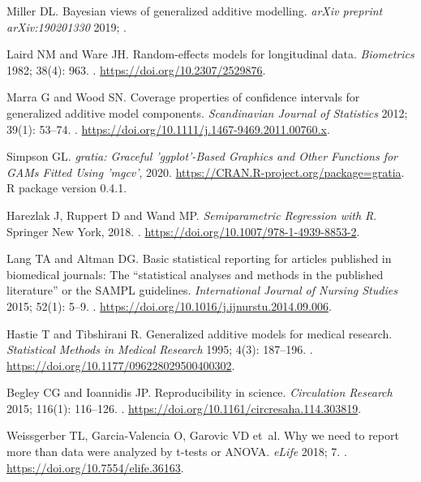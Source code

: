 \documentclass[Royal,times,doublespace,sagev]{sagej}
\begin{document}
\begin{thebibliography}{10}
Miller DL.
\newblock Bayesian views of generalized additive modelling.
\newblock \emph{arXiv preprint arXiv:190201330} 2019; .

Laird NM and Ware JH.
\newblock Random-effects models for longitudinal data.
\newblock \emph{Biometrics} 1982; 38(4): 963.
\newblock {}.
\newblock \urlprefix\url{https://doi.org/10.2307/2529876}.

Marra G and Wood SN.
\newblock Coverage properties of confidence intervals for generalized additive
  model components.
\newblock \emph{Scandinavian Journal of Statistics} 2012; 39(1): 53--74.
\newblock {}.
\newblock \urlprefix\url{https://doi.org/10.1111/j.1467-9469.2011.00760.x}.

Simpson GL.
\newblock \emph{gratia: Graceful 'ggplot'-Based Graphics and Other Functions
  for GAMs Fitted Using 'mgcv'}, 2020.
\newblock \urlprefix\url{https://CRAN.R-project.org/package=gratia}.
\newblock R package version 0.4.1.

Harezlak J, Ruppert D and Wand MP.
\newblock \emph{Semiparametric Regression with R}.
\newblock Springer New York, 2018.
\newblock {}.
\newblock \urlprefix\url{https://doi.org/10.1007/978-1-4939-8853-2}.

Lang TA and Altman DG.
\newblock Basic statistical reporting for articles published in biomedical
  journals: The {\textquotedblleft}statistical analyses and methods in the
  published literature{\textquotedblright} or the {SAMPL} guidelines.
\newblock \emph{International Journal of Nursing Studies} 2015; 52(1): 5--9.
\newblock {}.
\newblock \urlprefix\url{https://doi.org/10.1016/j.ijnurstu.2014.09.006}.

Hastie T and Tibshirani R.
\newblock Generalized additive models for medical research.
\newblock \emph{Statistical Methods in Medical Research} 1995; 4(3): 187--196.
\newblock {}.
\newblock \urlprefix\url{https://doi.org/10.1177/096228029500400302}.

Begley CG and Ioannidis JP.
\newblock Reproducibility in science.
\newblock \emph{Circulation Research} 2015; 116(1): 116--126.
\newblock {}.
\newblock \urlprefix\url{https://doi.org/10.1161/circresaha.114.303819}.

Weissgerber TL, Garcia-Valencia O, Garovic VD et~al.
\newblock Why we need to report more than {\textquotesingle}data were analyzed
  by t-tests or {ANOVA}{\textquotesingle}.
\newblock \emph{{eLife}} 2018; 7.
\newblock {}.
\newblock \urlprefix\url{https://doi.org/10.7554/elife.36163}.

\end{thebibliography}
\end{document}
